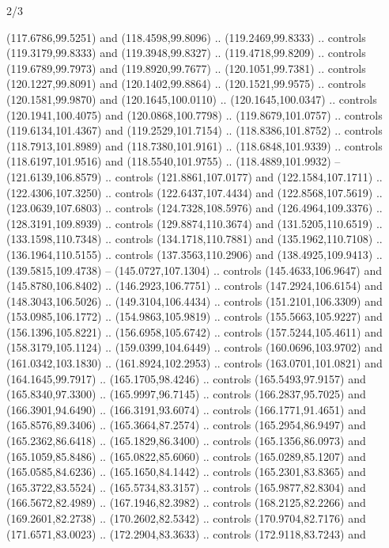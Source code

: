 \begin{flagdescription}{2/3}
\begin{scope}[shift={(0.5\flaglength,0.5)},scale=\flagwidth/320]
\begin{scope}[y=0.8pt, x=0.8pt, yscale=-1,shift={(-118.3,-146)}]
  (117.6786,99.5251) and (118.4598,99.8096) .. (119.2469,99.8333) .. controls
  (119.3179,99.8333) and (119.3948,99.8327) .. (119.4718,99.8209) .. controls
  (119.6789,99.7973) and (119.8920,99.7677) .. (120.1051,99.7381) .. controls
  (120.1227,99.8091) and (120.1402,99.8864) .. (120.1521,99.9575) .. controls
  (120.1581,99.9870) and (120.1645,100.0110) .. (120.1645,100.0347) .. controls
  (120.1941,100.4075) and (120.0868,100.7798) .. (119.8679,101.0757) .. controls
  (119.6134,101.4367) and (119.2529,101.7154) .. (118.8386,101.8752) .. controls
  (118.7913,101.8989) and (118.7380,101.9161) .. (118.6848,101.9339) .. controls
  (118.6197,101.9516) and (118.5540,101.9755) .. (118.4889,101.9932) --
  (121.6139,106.8579) .. controls (121.8861,107.0177) and (122.1584,107.1711) ..
  (122.4306,107.3250) .. controls (122.6437,107.4434) and (122.8568,107.5619) ..
  (123.0639,107.6803) .. controls (124.7328,108.5976) and (126.4964,109.3376) ..
  (128.3191,109.8939) .. controls (129.8874,110.3674) and (131.5205,110.6519) ..
  (133.1598,110.7348) .. controls (134.1718,110.7881) and (135.1962,110.7108) ..
  (136.1964,110.5155) .. controls (137.3563,110.2906) and (138.4925,109.9413) ..
  (139.5815,109.4738) -- (145.0727,107.1304) .. controls (145.4633,106.9647) and
  (145.8780,106.8402) .. (146.2923,106.7751) .. controls (147.2924,106.6154) and
  (148.3043,106.5026) .. (149.3104,106.4434) .. controls (151.2101,106.3309) and
  (153.0985,106.1772) .. (154.9863,105.9819) .. controls (155.5663,105.9227) and
  (156.1396,105.8221) .. (156.6958,105.6742) .. controls (157.5244,105.4611) and
  (158.3179,105.1124) .. (159.0399,104.6449) .. controls (160.0696,103.9702) and
  (161.0342,103.1830) .. (161.8924,102.2953) .. controls (163.0701,101.0821) and
  (164.1645,99.7917) .. (165.1705,98.4246) .. controls (165.5493,97.9157) and
  (165.8340,97.3300) .. (165.9997,96.7145) .. controls (166.2837,95.7025) and
  (166.3901,94.6490) .. (166.3191,93.6074) .. controls (166.1771,91.4651) and
  (165.8576,89.3406) .. (165.3664,87.2574) .. controls (165.2954,86.9497) and
  (165.2362,86.6418) .. (165.1829,86.3400) .. controls (165.1356,86.0973) and
  (165.1059,85.8486) .. (165.0822,85.6060) .. controls (165.0289,85.1207) and
  (165.0585,84.6236) .. (165.1650,84.1442) .. controls (165.2301,83.8365) and
  (165.3722,83.5524) .. (165.5734,83.3157) .. controls (165.9877,82.8304) and
  (166.5672,82.4989) .. (167.1946,82.3982) .. controls (168.2125,82.2266) and
  (169.2601,82.2738) .. (170.2602,82.5342) .. controls (170.9704,82.7176) and
  (171.6571,83.0023) .. (172.2904,83.3633) .. controls (172.9118,83.7243) and

\end{scope}
\end{scope}
\end{flagdescription}
